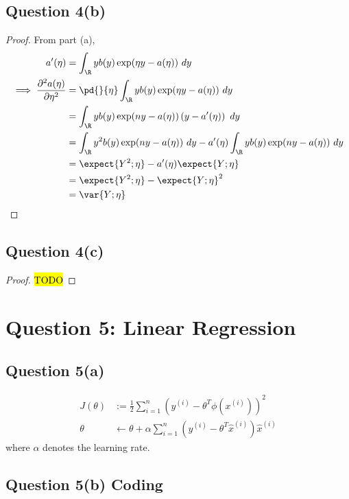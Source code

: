 \documentclass[11pt]{article}
\newcommand{\upi}[0]{^{(i)}}
\begin{document}
	\newpage
	\subsection{Question 4(b)}
	\begin{proof}
		From part (a),
		\begin{align}
			a'(\eta) &= \int_\R y b(y) \exp(\eta y - a(\eta))\ dy \\
			\implies \frac{\partial^2 a(\eta)}{\partial \eta^2} &= \pd{}{\eta} \int_\R y b(y) \exp(\eta y - a(\eta))\ dy \\
			&= \int_\R y b(y) \exp(ny - a(\eta)) \left (
				y - a'(\eta)
			\right)\ dy \\
			&= \int_\R y^2 b(y) \exp(ny - a(\eta))\ dy - a'(\eta) \int_\R y b(y) \exp(ny - a(\eta))\ dy \\
			&= \expect{Y^2; \eta} - a'(\eta) \expect{Y; \eta} \\
			&= \expect{Y^2; \eta} - \expect{Y; \eta}^2 \\
			&= \var{Y; \eta}
		\end{align}
	\end{proof}
	
	\newpage
	\subsection{Question 4(c)}
	\begin{proof}
		\hl{TODO}
	\end{proof}
	
	\newpage
	\section{Question 5: Linear Regression}
	\subsection{Question 5(a)}
	\begin{align}
		J(\theta) &:= \frac{1}{2} \sum_{i=1}^n \left(y\upi - \theta^T \phi(x\upi) \right)^2 \\
		\theta &\leftarrow \theta + \alpha \sum_{i=1}^n \left(y\upi - \theta^T \hat{x}\upi \right) \hat{x}\upi
	\end{align}
	where $\alpha$ denotes the learning rate.
	\subsection{Question 5(b) Coding}
\end{document}
